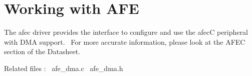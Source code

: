 \hypertarget{group__afe__dma__module}{}\section{Working with A\+FE}
\label{group__afe__dma__module}
The afec driver provides the interface to configure and use the afecC peripheral with D\+MA support.~\newline
 For more accurate information, please look at the A\+F\+EC section of the Datasheet.

Related files \+:~\newline
afe\+\_\+dma.\+c~\newline
 afe\+\_\+dma.\+h~\newline
 